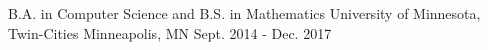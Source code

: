 

\begin{cventries}

  \cventry
    {B.A. in Computer Science and B.S. in Mathematics} %
    {University of Minnesota, Twin-Cities} %
    {Minneapolis, MN} %
    {Sept. 2014 - Dec. 2017} %
    {}

\end{cventries}

